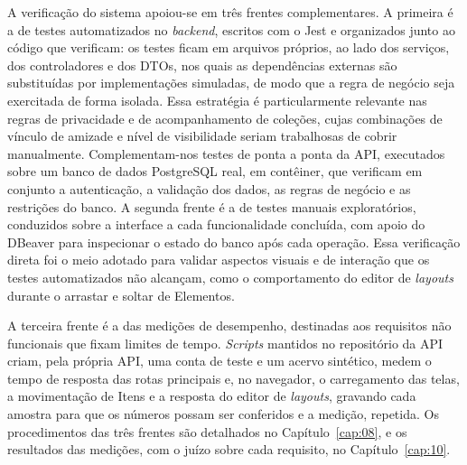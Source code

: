 A verificação do sistema apoiou-se em três frentes complementares. A primeira é a de testes automatizados no \textit{backend}, escritos com o Jest e organizados junto ao código que verificam: os testes ficam em arquivos próprios, ao lado dos serviços, dos controladores e dos DTOs, nos quais as dependências externas são substituídas por implementações simuladas, de modo que a regra de negócio seja exercitada de forma isolada. Essa estratégia é particularmente relevante nas regras de privacidade e de acompanhamento de coleções, cujas combinações de vínculo de amizade e nível de visibilidade seriam trabalhosas de cobrir manualmente. Complementam-nos testes de ponta a ponta da API, executados sobre um banco de dados PostgreSQL real, em contêiner, que verificam em conjunto a autenticação, a validação dos dados, as regras de negócio e as restrições do banco.
A segunda frente é a de testes manuais exploratórios, conduzidos sobre a interface a cada funcionalidade concluída, com apoio do DBeaver para inspecionar o estado do banco após cada operação. Essa verificação direta foi o meio adotado para validar aspectos visuais e de interação que os testes automatizados não alcançam, como o comportamento do editor de \textit{layouts} durante o arrastar e soltar de Elementos.

A terceira frente é a das medições de desempenho, destinadas aos requisitos não funcionais que fixam limites de tempo. \textit{Scripts} mantidos no repositório da API criam, pela própria API, uma conta de teste e um acervo sintético, medem o tempo de resposta das rotas principais e, no navegador, o carregamento das telas, a movimentação de Itens e a resposta do editor de \textit{layouts}, gravando cada amostra para que os números possam ser conferidos e a medição, repetida. Os procedimentos das três frentes são detalhados no Capítulo~\ref{cap:08}, e os resultados das medições, com o juízo sobre cada requisito, no Capítulo~\ref{cap:10}.


